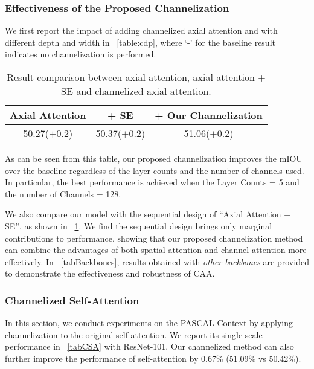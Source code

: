 \documentclass[letterpaper]{article} \usepackage{aaai22}  \usepackage{times}  \usepackage{helvet}  \usepackage{courier}  \usepackage[hyphens]{url}  \usepackage{graphicx} \urlstyle{rm} \def\UrlFont{\rm}  \usepackage{natbib}  \usepackage{caption} \DeclareCaptionStyle{ruled}{labelfont=normalfont,labelsep=colon,strut=off} \frenchspacing  \setlength{\pdfpagewidth}{8.5in}  \setlength{\pdfpageheight}{11in}  \usepackage{algorithm}
\begin{document}
\subsubsection{Effectiveness of the Proposed Channelization}
We first report the impact of adding channelized axial attention and with different depth and width in \tablename{~\ref{table:cdp}}, where `-' for the baseline result indicates no channelization is performed. 



\begin{table}[t]
    \centering
    \small
    \begin{tabular}{c|c|c}
        \toprule[1pt]
        Axial Attention& + SE & + Our Channelization \\
        \midrule[0.5pt]
		\midrule[0.5pt]
        50.27($\pm$0.2) & 50.37($\pm$0.2)& 51.06($\pm$0.2) \\
        \bottomrule[1pt]
    \end{tabular}
     \caption{ Result comparison between axial attention, axial attention + SE and channelized axial attention.  }
    \label{table:sedesign}
\end{table}


As can be seen from this table, our proposed channelization improves the mIOU over the baseline regardless of the layer counts and the number of channels used. 
In particular, the best performance is achieved when the Layer Counts = 5 and the number of Channels = 128. 

We also compare our model with the sequential design of ``Axial Attention + SE'', as shown in \tablename{~\ref{table:sedesign}}. 
We find the sequential design brings only marginal contributions to performance, showing that our proposed channelization method can combine the advantages of both spatial attention and channel attention more effectively. 
In \tablename{~\ref{tabBackbones}}, results obtained with \textit{other backbones} are provided to demonstrate the effectiveness and robustness of CAA.

\subsubsection{Channelized Self-Attention}
In this section, we conduct experiments on the PASCAL Context by applying channelization to the original self-attention. 
We report its single-scale performance in~\tablename{ \ref{tabCSA}} with ResNet-101. 
Our channelized method can also further improve the performance of self-attention by 0.67\% (51.09\% vs 50.42\%).
\end{document}
